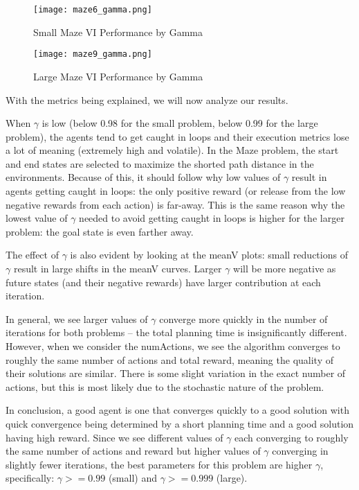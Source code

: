 \documentclass{article}
\begin{document}
\begin{figure}
    \centering
    \begin{minipage}{0.5\textwidth}
        \centering
        \texttt{[image: maze6\_gamma.png]}
        \caption{Small Maze VI Performance by Gamma}
        \label{fig:small-maze-vi}
    \end{minipage}\hfill
    \begin{minipage}{0.5\textwidth}
        \centering
        \texttt{[image: maze9\_gamma.png]}
        \caption{Large Maze VI Performance by Gamma}
        \label{fig:large-maze-vi}
    \end{minipage}
\end{figure}

With the metrics being explained, we will now analyze our results.

When $\gamma$ is low (below 0.98 for the small problem, below 0.99 for the large problem), the agents
tend to get caught in loops and their execution metrics lose a lot of meaning (extremely high and volatile). In the
Maze problem, the start and end states are selected to maximize the shorted path distance in the environments.
Because of this, it should follow why low values of $\gamma$ result in agents getting caught in loops: the only
positive reward (or release from the low negative rewards from each action) is far-away. This is the
same reason why the lowest value of $\gamma$ needed to avoid getting caught in loops is higher for the
larger problem: the goal state is even farther away.

The effect of $\gamma$ is also evident by looking at the meanV plots: small reductions of $\gamma$ result
in large shifts in the meanV curves. Larger $\gamma$ will be more negative as future states (and their
negative rewards) have larger contribution at each iteration.

In general, we see larger values of $\gamma$ converge more quickly in the number of iterations for both problems --
the total planning time is insignificantly different. However, when we consider the numActions, we see the algorithm
converges to roughly the same number of actions and total reward, meaning the quality of their solutions are similar.
There is some slight variation in the exact number of actions, but this is most likely due to the stochastic nature
of the problem.

In conclusion, a good agent is one that converges quickly to a good solution with quick convergence being determined by
a short planning time and a good solution having high reward. Since we see different values of $\gamma$ each converging
to roughly the same number of actions and reward but higher values of $\gamma$ converging in slightly fewer iterations,
the best parameters for this problem are higher $\gamma$, specifically: $\gamma >= 0.99$ (small) and $\gamma >= 0.999$ (large).
\end{document}

